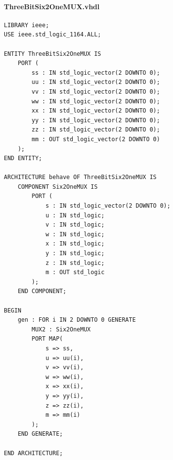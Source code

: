 \documentclass[13pt,a4paper]{report}
\begin{document}
\paragraph{ThreeBitSix2OneMUX.vhdl}
\begin{verbatim}
LIBRARY ieee;
USE ieee.std_logic_1164.ALL;

ENTITY ThreeBitSix2OneMUX IS
	PORT (
		ss : IN std_logic_vector(2 DOWNTO 0);
		uu : IN std_logic_vector(2 DOWNTO 0);
		vv : IN std_logic_vector(2 DOWNTO 0);
		ww : IN std_logic_vector(2 DOWNTO 0);
		xx : IN std_logic_vector(2 DOWNTO 0);
		yy : IN std_logic_vector(2 DOWNTO 0);
		zz : IN std_logic_vector(2 DOWNTO 0);
		mm : OUT std_logic_vector(2 DOWNTO 0)
	);
END ENTITY;

ARCHITECTURE behave OF ThreeBitSix2OneMUX IS
	COMPONENT Six2OneMUX IS
		PORT (
			s : IN std_logic_vector(2 DOWNTO 0);
			u : IN std_logic;
			v : IN std_logic;
			w : IN std_logic;
			x : IN std_logic;
			y : IN std_logic;
			z : IN std_logic;
			m : OUT std_logic
		);
	END COMPONENT;

BEGIN
	gen : FOR i IN 2 DOWNTO 0 GENERATE
		MUX2 : Six2OneMUX
		PORT MAP(
			s => ss, 
			u => uu(i), 
			v => vv(i), 
			w => ww(i), 
			x => xx(i), 
			y => yy(i), 
			z => zz(i), 
			m => mm(i)
		);
	END GENERATE;

END ARCHITECTURE;
\end{verbatim}
\end{document}
